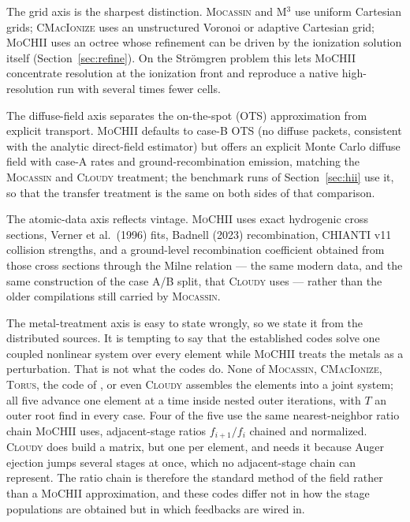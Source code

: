 \documentclass[twocolumn,linenumbers]{aastex702}
\newcommand{\MoCHII}{\textsc{MoCHII}}
\begin{document}
The grid axis is the sharpest distinction.  \textsc{Mocassin} and
\textsc{M}$^{3}$ use uniform Cartesian grids; \textsc{CMacIonize} uses an
unstructured Voronoi or adaptive Cartesian grid; \MoCHII{} uses an octree
whose refinement can be driven by the ionization solution itself
(Section~\ref{sec:refine}).  On the Str\"omgren problem this lets
\MoCHII{} concentrate resolution at the ionization front and reproduce a
native high-resolution run with several times fewer cells.

The diffuse-field axis separates the on-the-spot (OTS) approximation from
explicit transport.  \MoCHII{} defaults to case-B OTS (no diffuse packets,
consistent with the analytic direct-field estimator) but offers an
explicit Monte Carlo diffuse field with case-A rates and
ground-recombination emission, matching the \textsc{Mocassin} and
\textsc{Cloudy} treatment; the benchmark runs of Section~\ref{sec:hii} use
it, so that the transfer treatment is the same on both sides of that
comparison.

The atomic-data axis reflects vintage.  \MoCHII{} uses exact hydrogenic
cross sections, Verner et al.\ (1996) fits, Badnell (2023) recombination,
CHIANTI v11 collision strengths, and a ground-level recombination
coefficient obtained from those cross sections through the Milne relation
--- the same modern data, and the same construction of the case A/B split,
that \textsc{Cloudy} uses --- rather than the older compilations still
carried by \textsc{Mocassin}.

The metal-treatment axis is easy to state wrongly, so we state it from the
distributed sources.  It is tempting to say that the established codes solve
one coupled nonlinear system over every element while \MoCHII{} treats the
metals as a perturbation.  That is not what the codes do.  None of
\textsc{Mocassin}, \textsc{CMacIonize}, \textsc{Torus}, the code of
\citet{wood2004}, or even \textsc{Cloudy} assembles the elements into a joint
system; all five advance one element at a time inside nested outer
iterations, with $T$ an outer root find in every case.  Four of the five use
the same nearest-neighbor ratio chain \MoCHII{} uses, adjacent-stage ratios
$f_{i+1}/f_i$ chained and normalized.  \textsc{Cloudy} does build a matrix,
but one per element, and needs it because Auger ejection jumps several stages
at once, which no adjacent-stage chain can represent.  The ratio chain is
therefore the standard method of the field rather than a \MoCHII{}
approximation, and these codes differ not in how the stage populations are
obtained but in which feedbacks are wired in.
\end{document}
